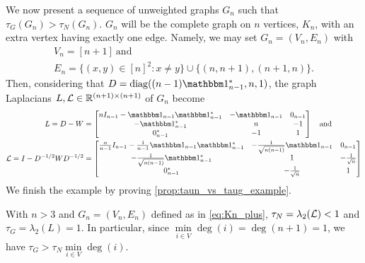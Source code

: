 We now present a sequence of unweighted graphs $G_n$ such that $\tau_G(G_n) > \tau_N(G_n)$.  $G_n$ will be the complete graph on $n$ vertices, $K_n$, with an extra vertex having exactly one edge.  Namely, we may set $G_n = (V_n, E_n)$ with \begin{equation} \begin{gathered} V_n = [n + 1] \ \text{and} \\ E_n = \{(x, y) \in [n]^2 : x \neq y\} \cup \{(n, n + 1), (n + 1, n)\}.\end{gathered} \label{eq:Kn_plus} \end{equation}  Then, considering that $D = \diag((n - 1) \one_{n -1}^*, n, 1)$, the graph Laplacians $L, \mathcal{L} \in \mathbb{R}^{(n + 1) \times (n + 1)}$ of $G_n$ become
\begin{align*} L = D - W &= 
\begin{bmatrix}
  n I_{n - 1} - \one_{n - 1} \one_{n - 1}^* & -\one_{n - 1} & 0_{n - 1} \\
  -\one_{n - 1}^* & n & -1 \\
  0_{n - 1}^* & -1 & 1 \\
\end{bmatrix}
\quad \text{and} \\
\Lc = I - D^{-1/2} W D^{-1/2} &=
\begin{bmatrix}
  \frac{n}{n - 1} I_{n - 1} - \frac{1}{n - 1} \one_{n - 1} \one_{n - 1}^* &
  -\frac{1}{\sqrt{n(n - 1)}} \one_{n - 1} & 0_{n - 1} \\
  -\frac{1}{\sqrt{n(n - 1)}} \one_{n - 1}^* & 1 & -\frac{1}{\sqrt{n}} \\
  0_{n - 1}^* & -\frac{1}{\sqrt{n}} & 1
\end{bmatrix}
\end{align*}
We finish the example by proving \cref{prop:taun_vs_taug_example}.
\begin{proposition}
  With $n > 3$ and $G_n = (V_n, E_n)$ defined as in \eqref{eq:Kn_plus}, $\tau_N = \lambda_2(\mathcal{L}) < 1$ and $\tau_G = \lambda_2(L) = 1$.  In particular, since $\min\limits_{i \in V} \deg(i) = \deg(n + 1) = 1$, we have $\tau_G > \tau_N \min\limits_{i \in V} \deg(i)$.
  \label{prop:taun_vs_taug_example}
\end{proposition}

